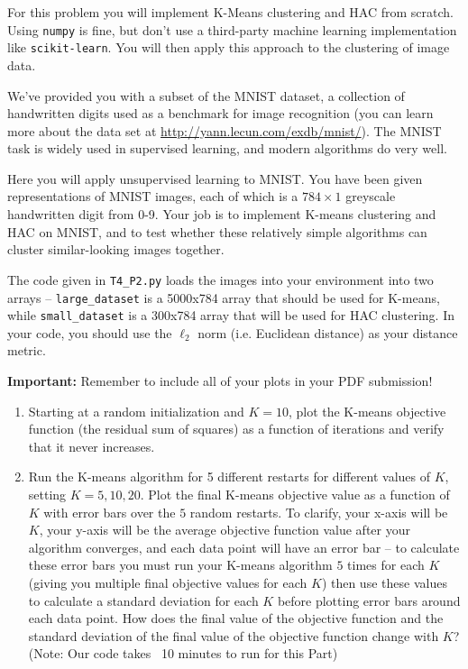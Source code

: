 \documentclass[submit]{harvardml}
\begin{document}

\begin{problem}


For this problem you will implement K-Means clustering and HAC from
scratch. Using \texttt{numpy} is fine, but don't use a third-party
machine learning implementation like \texttt{scikit-learn}. You will
then apply this approach to the clustering of image data.

We've provided you with a subset of the MNIST dataset, a collection of
handwritten digits used as a benchmark for image recognition (you can
learn more about the data set at
\url{http://yann.lecun.com/exdb/mnist/}). The MNIST task is widely
used in supervised learning, and modern algorithms do very well.

Here you will apply unsupervised learning to MNIST. You have been given
representations of MNIST images, each of which is a $784\times1$
greyscale handwritten digit from 0-9. Your job is to implement K-means
clustering and HAC on MNIST, and to test whether these relatively
simple algorithms can cluster similar-looking images together.

The code given in \texttt{T4\_P2.py} loads the images into your environment into two arrays -- \texttt{large\_dataset} is a 5000x784 array that should be used for K-means, while \texttt{small\_dataset} is a 300x784 array that will be used for HAC clustering. In your code, you should use the $\ell_2$ norm (i.e. Euclidean distance) as your distance metric.

\textbf{Important:} Remember to include all of your plots in your PDF submission!

\begin{enumerate}

\item Starting at a random initialization and $K = 10$, plot
  the K-means objective function (the residual sum of squares) as a function of iterations and verify
  that it never increases.

\item Run the K-means algorithm for 5 different restarts for different
  values of $K$, setting $K = 5, 10, 20$. Plot the final K-means objective value as a function
  of $K$ with error bars over the $5$ random restarts. To clarify, your
  x-axis will be $K$, your y-axis will be the average objective function value
  after your algorithm converges, and each data point will have an
  error bar -- to calculate these error bars you must run your K-means
  algorithm $5$ times for each $K$ (giving you multiple final objective values
  for each $K$) then use these values to calculate a standard deviation for
  each $K$ before plotting error bars around each data point. How
  does the final value of the objective function and the standard deviation of the final
  value of the objective function change with $K$? (Note: Our code takes ~10 minutes to run for this Part)
  

\end{enumerate}
\end{problem}
\end{document}
